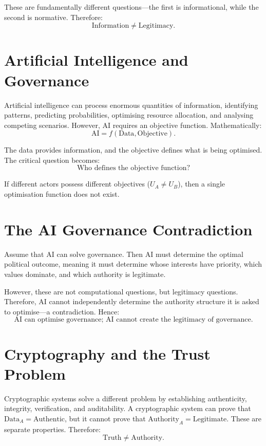 \documentclass[11pt,openany]{book}
\theoremstyle{plain}
\theoremstyle{definition}
\begin{document}
These are fundamentally different questions—the first is informational, while the second is normative. Therefore:
\[
\text{Information} \neq \text{Legitimacy}.
\]

\section*{Artificial Intelligence and Governance}

Artificial intelligence can process enormous quantities of information, identifying patterns, predicting probabilities, optimising resource allocation, and analysing competing scenarios. However, AI requires an objective function. Mathematically:
\[
\text{AI} = f(\text{Data}, \text{Objective}).
\]

The data provides information, and the objective defines what is being optimised. The critical question becomes:
\[
\boxed{
\text{Who defines the objective function?}
}
\]

If different actors possess different objectives (\(U_A \neq U_B\)), then a single optimisation function does not exist.

\section*{The AI Governance Contradiction}

Assume that AI can solve governance. Then AI must determine the optimal political outcome, meaning it must determine whose interests have priority, which values dominate, and which authority is legitimate. 

However, these are not computational questions, but legitimacy questions. Therefore, AI cannot independently determine the authority structure it is asked to optimise—a contradiction. Hence:
\[
\boxed{
\text{AI can optimise governance; AI cannot create the legitimacy of governance.}
}
\]

\section*{Cryptography and the Trust Problem}

Cryptographic systems solve a different problem by establishing authenticity, integrity, verification, and auditability. A cryptographic system can prove that \(\text{Data}_A = \text{Authentic}\), but it cannot prove that \(\text{Authority}_A = \text{Legitimate}\). These are separate properties. Therefore:
\[
\text{Truth} \neq \text{Authority}.
\]
\end{document}
